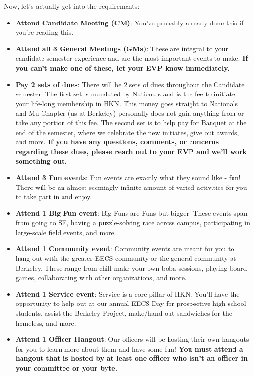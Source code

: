 \documentclass[11pt, article, oneside]{memoir}
\begin{document}
        Now, let's actually get into the requirements:
            \begin{itemize}
                \item \textbf{Attend Candidate Meeting (CM)}: You've probably already done this if you're reading this.
                \item \textbf{Attend all 3 General Meetings (GMs)}: These are integral to your candidate semester experience and are the most important events to make. \textbf{If you can't make one of these, let your EVP know immediately.}
                \item \textbf{Pay 2 sets of dues}: There will be 2 sets of dues throughout the Candidate semester. The first set is mandated by Nationals and is the fee to initiate your life-long membership in HKN. This money goes straight to Nationals and Mu Chapter (us at Berkeley) personally does not gain anything from or take any portion of this fee. The second set is to help pay for Banquet at the end of the semester, where we celebrate the new initiates, give out awards, and more. \textbf{If you have any questions, comments, or concerns regarding these dues, please reach out to your EVP and we'll work something out.}
                \item \textbf{Attend 3 Fun events}: Fun events are exactly what they sound like - fun! There will be an almost seemingly-infinite amount of varied activities for you to take part in and enjoy.
                \item \textbf{Attend 1 Big Fun event}: Big Funs are Funs but bigger. These events span from going to SF, having a puzzle-solving race across campus, participating in large-scale field events, and more.
                \item \textbf{Attend 1 Community event}: Community events are meant for you to hang out with the greater EECS community or the general community at Berkeley. These range from chill make-your-own boba sessions, playing board games, collaborating with other organizations, and more.
                \item \textbf{Attend 1 Service event}: Service is a core pillar of HKN. You'll have the opportunity to help out at our annual EECS Day for prospective high school students, assist the Berkeley Project, make/hand out sandwiches for the homeless, and more.
                \item \textbf{Attend 1 Officer Hangout}: Our officers will be hosting their own hangouts for you to learn more about them and have some fun! \textbf{You must attend a hangout that is hosted by at least one officer who isn't an officer in your committee or your byte.}

\end{itemize}
\end{document}
